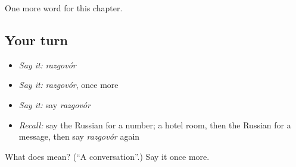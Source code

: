 \begin{grammarlens}[title={What you've built}]
One more word for this chapter.
\end{grammarlens}

\subsection*{Your turn}
\begin{itemize}
\raggedright
  \item \emph{Say it:} \emph{razgovór}
  \item \emph{Say it:} \emph{razgovór}, once more
  \item \emph{Say it:} say \emph{razgovór}
  \item \emph{Recall:} say the Russian for a number; a hotel room, then the Russian for a message, then say \emph{razgovór} again
\end{itemize}

\begin{tcolorbox}[breakable,colback=teal!4,colframe=teal!35!black,title={Before you move on}]
What does  mean? (\textquotedblleft{}A conversation\textquotedblright{}.) Say it once more.
\end{tcolorbox}
